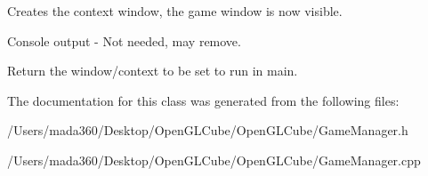 Creates the context window, the game window is now visible.

Console output -\/ Not needed, may remove.

Return the window/context to be set to run in main. 

The documentation for this class was generated from the following files\+:\begin{DoxyCompactItemize}
\item 
/\+Users/mada360/\+Desktop/\+Open\+G\+L\+Cube/\+Open\+G\+L\+Cube/Game\+Manager.\+h\item 
/\+Users/mada360/\+Desktop/\+Open\+G\+L\+Cube/\+Open\+G\+L\+Cube/Game\+Manager.\+cpp\end{DoxyCompactItemize}
